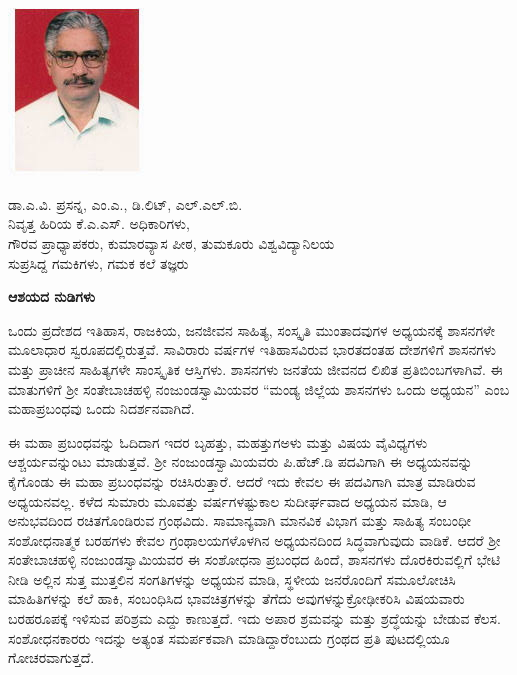 
\chapter{}

\includegraphics[scale=3]{"images/prasanna.jpeg"}

\noindent
ಡಾ.ಎ.ವಿ. ಪ್ರಸನ್ನ, ಎಂ.ಎ., ಡಿ.ಲಿಟ್​, ಎಲ್​.ಎಲ್​.ಬಿ. \\ ನಿವೃತ್ತ ಹಿರಿಯ ಕೆ.ಎ.ಎಸ್​. ಅಧಿಕಾರಿಗಳು, \\ ಗೌರವ ಪ್ರಾಧ್ಯಾಪಕರು, ಕುಮಾರವ್ಯಾಸ ಪೀಠ, ತುಮಕೂರು ವಿಶ್ವವಿದ್ಯಾನಿಲಯ \\ ಸುಪ್ರಸಿದ್ದ ಗಮಕಿಗಳು, ಗಮಕ ಕಲೆ ತಜ್ಞರು

\begin{center}
\textbf{ಆಶಯದ ನುಡಿಗಳು}
\end{center}

ಒಂದು ಪ್ರದೇಶದ ಇತಿಹಾಸ, ರಾಜಕಿಯ, ಜನಜೀವನ ಸಾಹಿತ್ಯ, ಸಂಸ್ಕೃತಿ ಮುಂತಾದವುಗಳ ಅಧ್ಯಯನಕ್ಕೆ ಶಾಸನಗಳೇ ಮೂಲಾಧಾರ ಸ್ವರೂಪದಲ್ಲಿರುತ್ತವೆ. ಸಾವಿರಾರು ವರ್ಷಗಳ ಇತಿಹಾಸವಿರುವ ಭಾರತದಂತಹ ದೇಶಗಳಿಗೆ ಶಾಸನಗಳು ಮತ್ತು ಪ್ರಾಚೀನ ಸಾಹಿತ್ಯಗಳೇ ಸಾಂಸ್ಕೃತಿಕ ಆಸ್ತಿಗಳು. ಶಾಸನಗಳು ಜನತೆಯ ಜೀವನದ ಲಿಖಿತ ಪ್ರತಿಬಿಂಬ\-ಗಳಾಗಿವೆ. ಈ ಮಾತುಗಳಿಗೆ ಶ‍್ರೀ ಸಂತೇಬಾಚಹಳ್ಳಿ ನಂಜುಂಡಸ್ವಾಮಿಯವರ “ಮಂಡ್ಯ ಜಿಲ್ಲೆಯ ಶಾಸನಗಳು ಒಂದು ಅಧ್ಯಯನ” ಎಂಬ ಮಹಾಪ್ರಬಂಧವು ಒಂದು ನಿದರ್ಶನವಾಗಿದೆ.

ಈ ಮಹಾ ಪ್ರಬಂಧವನ್ನು ಓದಿದಾಗ ಇದರ ಬೃಹತ್ತು, ಮಹತ್ತುಗಅಳು ಮತ್ತು ವಿಷಯ ವೈವಿಧ್ಯಗಳು ಆಶ್ಚರ್ಯವನ್ನುಂಟು ಮಾಡುತ್ತವೆ. ಶ‍್ರೀ ನಂಜುಂಡಸ್ವಾಮಿಯವರು ಪಿ.ಹೆಚ್​.ಡಿ ಪದವಿಗಾಗಿ ಈ ಅಧ್ಯಯನವನ್ನು ಕೈಗೊಂಡು ಈ ಮಹಾ ಪ್ರಬಂಧವನ್ನು ರಚಿಸಿರುತ್ತಾರೆ. ಆದರೆ ಇದು ಕೇವಲ ಈ ಪದವಿಗಾಗಿ ಮಾತ್ರ ಮಾಡಿರುವ ಅಧ್ಯಯನವಲ್ಲ. ಕಳೆದ ಸುಮಾರು ಮೂವತ್ತು ವರ್ಷಗಳಷ್ಟುಕಾಲ ಸುದೀರ್ಘವಾದ ಅಧ್ಯಯನ ಮಾಡಿ, ಆ ಅನುಭವದಿಂದ ರಚಿತಗೊಂಡಿರುವ ಗ್ರಂಥವಿದು. ಸಾಮಾನ್ಯವಾಗಿ ಮಾನವಿಕ ವಿಭಾಗ ಮತ್ತು ಸಾಹಿತ್ಯ ಸಂಬಂಧೀ ಸಂಶೋಧನಾತ್ಮಕ ಬರಹಗಳು ಕೇವಲ ಗ್ರಂಥಾಲಯ\-ಗಳೊಳಗಿನ ಅಧ್ಯಯನದಿಂದ ಸಿದ್ಧವಾಗುವುದು ವಾಡಿಕೆ. ಆದರೆ ಶ‍್ರೀ ಸಂತೇಬಾಚಹಳ್ಳಿ ನಂಜುಂಡಸ್ವಾಮಿಯವರ ಈ ಸಂಶೋಧನಾ ಪ್ರಬಂಧದ ಹಿಂದೆ, ಶಾಸನಗಳು ದೊರಕಿರುವಲ್ಲಿಗೆ ಭೇಟಿ ನೀಡಿ ಅಲ್ಲಿನ ಸುತ್ತ ಮುತ್ತಲಿನ ಸಂಗತಿಗಳನ್ನು ಅಧ್ಯಯನ ಮಾಡಿ, ಸ್ಥಳೀಯ ಜನರೊಂದಿಗೆ ಸಮೂಲೋಚಿಸಿ ಮಾಹಿತಿಗಳನ್ನು ಕಲೆ ಹಾಕಿ, ಸಂಬಂಧಿಸಿದ ಭಾವಚಿತ್ರಗಳನ್ನು ತೆಗೆದು ಅವುಗಳನ್ನು\break ಕ್ರೋಢೀಕರಿಸಿ ವಿಷಯವಾರು ಬರಹರೂಪಕ್ಕೆ ಇಳಿಸುವ ಪರಿಶ್ರಮ ಎದ್ದು ಕಾಣುತ್ತದೆ. ಇದು ಅಪಾರ ಶ್ರಮವನ್ನು ಮತ್ತು ಶ್ರದ್ಧೆಯನ್ನು ಬೇಡುವ ಕೆಲಸ. ಸಂಶೋಧನಕಾರರು ಇದನ್ನು ಅತ್ಯಂತ ಸಮರ್ಪಕವಾಗಿ ಮಾಡಿದ್ದಾರೆಂಬುದು ಗ್ರಂಥದ ಪ್ರತಿ ಪುಟದಲ್ಲಿಯೂ ಗೋಚರವಾಗುತ್ತದೆ.

